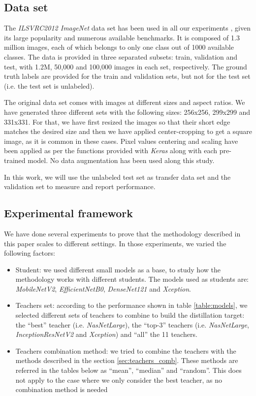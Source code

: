 \documentclass{elsarticle}
\begin{document}
	\subsection{Data set}
	The \textit{ILSVRC2012 ImageNet} data set has been used in all our experiments \citep{ILSVRC15}, given its large popularity and numerous available benchmarks. It is composed of 1.3 million images,  each of which belongs to only one class out of 1000 available classes. The data is provided in three separated subsets: train, validation and test, with 1.2M, 50,000 and 100,000 images in each set, respectively. The ground truth labels are provided for the train and validation sets, but not for the test set (i.e. the test set is unlabeled).
	
	The original data set comes with images at different sizes and aspect ratios. We have generated three different sets with the following sizes: 256x256, 299x299 and 331x331. For that, we have first resized the images so that their short edge matches the desired size and then we have applied center-cropping to get a square image, as it is common in these cases. Pixel values centering and scaling have been applied as per the functions provided with \textit{Keras} along with each pre-trained model. No data augmentation has been used along this study.
	
	In this work, we will use the unlabeled test set as transfer data set and the validation set to measure and report performance. 
	
	\subsection{Experimental framework}
	We have done several experiments to prove that the methodology described in this paper scales to different settings. In those experiments, we varied the following factors:
	
	\begin{itemize}
		\item Student: we used different small models as a base, to study how the methodology works with different students. The models used as students are: \textit{MobileNetV2}, \textit{EfficientNetB0}, \textit{DenseNet121} and \textit{Xception}.
		\item Teachers set: according to the performance shown in table \ref{table:models}, we selected different sets of teachers to combine to build the distillation target: the ``best'' teacher (i.e. \textit{NasNetLarge}), the ``top-3'' teachers (i.e. \textit{NasNetLarge}, \textit{InceptionResNetV2} and \textit{Xception}) and ``all'' the 11 teachers.
		\item Teachers combination method: we tried to combine the teachers with the methods described in the section \ref{sec:teachers_comb}. These methods are referred in the tables below as ``mean'', ``median'' and ``random''. This does not apply to the case where we only consider the best teacher, as no combination method is needed
	\end{itemize}
\end{document}
